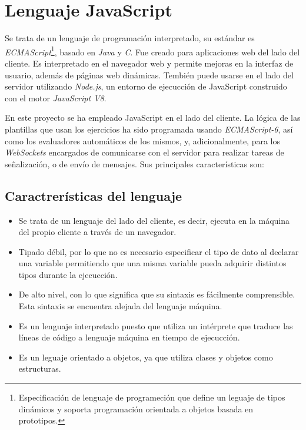 \documentclass[a4paper, 12pt]{book}
\begin{document}
\section{Lenguaje JavaScript}
\label{sec:javascript}

Se trata de un lenguaje de programación interpretado, su estándar es \textit{ECMAScript}\footnote{Especificación de lenguaje de programeción que define un leguaje de tipos dinámicos y soporta programación orientada a objetos basada en prototipos.}, basado en \textit{Java} y \textit{C}. Fue creado para aplicaciones web del lado del cliente. Es interpretado en el navegador web y permite mejoras en la interfaz de usuario, además de páginas web dinámicas. Tembién puede usarse en el lado del servidor utilizando \textit{Node.js}, un entorno de ejecucción de JavaScript construido con el motor \textit{JavaScript V8}.

En este proyecto se ha empleado JavaScript en el lado del cliente. La lógica de las plantillas que usan los ejercicios ha sido programada usando \textit{ECMAScript-6}, así como los evaluadores automáticos de los mismos, y, adicionalmente, para los \textit{WebSockets} encargados de comunicarse con el servidor para realizar tareas de señalización, o de envío de mensajes. Sus principales características son:

\subsection{Caractrerísticas del lenguaje}
\label{subsec:javascript}

\begin{itemize}
	\item Se trata de un lenguaje del lado del cliente, es decir, ejecuta en la máquina del propio cliente a través de un navegador.
	
	\item Tipado débil, por lo que no es necesario especificar el tipo de dato al declarar una variable permitiendo que una misma variable pueda adquirir distintos tipos durante la ejecucción.
	
	\item De alto nivel, con lo que significa que su sintaxis es fácilmente comprensible. Esta sintaxis se encuentra alejada del lenguaje máquina.
	
	\item Es un lenguaje interpretado puesto que utiliza un intérprete que traduce las líneas de código a lenguaje máquina en tiempo de ejecucción.

	\item Es un leguaje orientado a objetos, ya que utiliza clases y objetos como estructuras.
\end{itemize}
\end{document}
